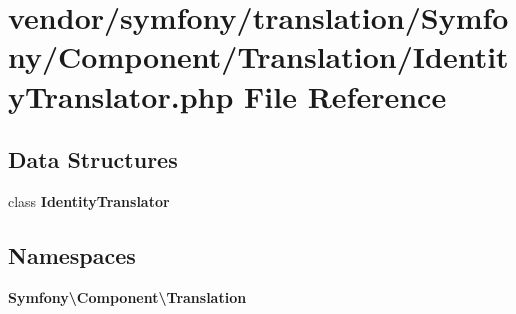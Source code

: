 \section{vendor/symfony/translation/\+Symfony/\+Component/\+Translation/\+Identity\+Translator.php File Reference}
\label{_identity_translator_8php}
\subsection*{Data Structures}
\begin{DoxyCompactItemize}
\item 
class {\bf Identity\+Translator}
\end{DoxyCompactItemize}
\subsection*{Namespaces}
\begin{DoxyCompactItemize}
\item 
 {\bf Symfony\textbackslash{}\+Component\textbackslash{}\+Translation}
\end{DoxyCompactItemize}
